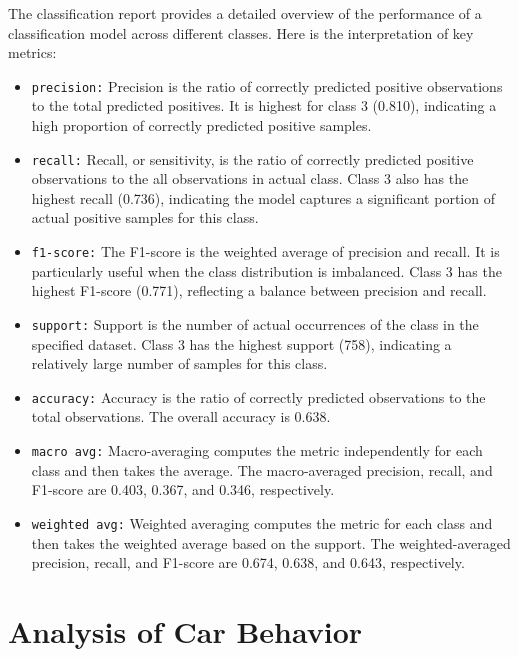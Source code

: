 \documentclass{article}
\begin{document}
The classification report provides a detailed overview of the performance of a classification model across different classes. Here is the interpretation of key metrics:

\begin{itemize}
    \item \texttt{precision:} Precision is the ratio of correctly predicted positive observations to the total predicted positives. It is highest for class 3 (0.810), indicating a high proportion of correctly predicted positive samples.

    \item \texttt{recall:} Recall, or sensitivity, is the ratio of correctly predicted positive observations to the all observations in actual class. Class 3 also has the highest recall (0.736), indicating the model captures a significant portion of actual positive samples for this class.

    \item \texttt{f1-score:} The F1-score is the weighted average of precision and recall. It is particularly useful when the class distribution is imbalanced. Class 3 has the highest F1-score (0.771), reflecting a balance between precision and recall.

    \item \texttt{support:} Support is the number of actual occurrences of the class in the specified dataset. Class 3 has the highest support (758), indicating a relatively large number of samples for this class.

    \item \texttt{accuracy:} Accuracy is the ratio of correctly predicted observations to the total observations. The overall accuracy is 0.638.

    \item \texttt{macro avg:} Macro-averaging computes the metric independently for each class and then takes the average. The macro-averaged precision, recall, and F1-score are 0.403, 0.367, and 0.346, respectively.

    \item \texttt{weighted avg:} Weighted averaging computes the metric for each class and then takes the weighted average based on the support. The weighted-averaged precision, recall, and F1-score are 0.674, 0.638, and 0.643, respectively.

\end{itemize}

\section{Analysis of Car Behavior}
\end{document}
